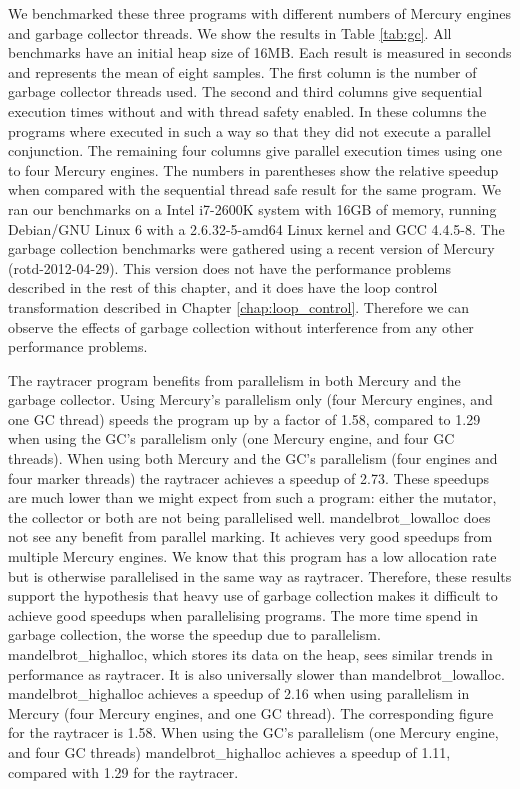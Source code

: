 We benchmarked these three programs with different numbers of Mercury
engines and garbage collector threads.
We show the results in Table \ref{tab:gc}.
All benchmarks have an initial heap size of 16MB.
Each result is measured in seconds and represents the mean of eight samples.
The first column is the number of garbage collector threads used.
The second and third columns give sequential execution times
without and with thread safety enabled.
In these columns the programs where executed in such a way so that they did
not execute a parallel conjunction.
The remaining four columns give parallel execution times using one to four
Mercury engines.
The numbers in parentheses show the relative speedup when compared with the
sequential thread safe result for the same program.
\label{cabsav}
We ran our benchmarks on
a Intel i7-2600K system
with 16GB of memory,
running Debian/GNU Linux 6
with a 2.6.32-5-amd64 Linux kernel and GCC 4.4.5-8.
The garbage collection benchmarks were gathered using a recent version of
Mercury (rotd-2012-04-29).
This version does not have the performance problems described in the
rest of this chapter,
and it does have the loop control transformation described
in Chapter \ref{chap:loop_control}.
Therefore we can observe the effects of garbage collection without
interference from any other performance problems.

The raytracer program benefits from parallelism in both Mercury and the
garbage collector.
Using Mercury's parallelism only (four Mercury engines, and one GC thread) 
speeds the program up by a factor of 1.58,
compared to 1.29 when using the GC's parallelism only (one Mercury engine,
and four GC threads).
When using both Mercury and the GC's parallelism (four engines and four
marker threads)
the raytracer achieves a speedup of 2.73.
These speedups are much lower than we might expect from such a program:
either the mutator, the collector or both are not being parallelised well.
mandelbrot\_lowalloc does not see any benefit from parallel marking.
It achieves very good speedups from multiple Mercury engines.
We know that this program has a low allocation rate
but is otherwise parallelised in the same way as raytracer.
Therefore,
these results support the hypothesis that heavy use of garbage collection
makes it difficult to achieve good speedups when parallelising programs.
The more time spend in garbage collection,
the worse the speedup due to parallelism.
mandelbrot\_highalloc, which stores its data on the heap,
sees similar trends in performance as raytracer.
It is also universally slower than mandelbrot\_lowalloc.
mandelbrot\_highalloc achieves a speedup of 2.16 when using parallelism in
Mercury (four Mercury engines, and one GC thread).
The corresponding figure for the raytracer is 1.58.
When using the GC's parallelism
(one Mercury engine, and four GC threads)
mandelbrot\_highalloc achieves a speedup of 1.11,
compared with 1.29 for the raytracer.

